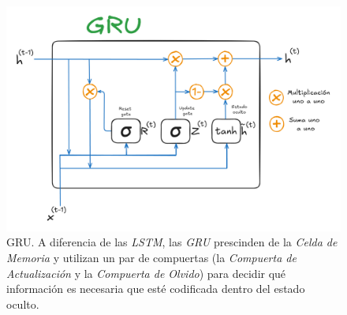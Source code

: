 \begin{figure}[ht!]
\centering
\includegraphics[width=1.0 \textwidth]{Chapters/2. Transformer/Figures/rnn/GRU.png}
\caption{GRU. A diferencia de las \textit{LSTM}, las \textit{GRU} prescinden de la
         \textit{Celda de Memoria} y utilizan un par de compuertas (la \textit{Compuerta de
         Actualización} y la \textit{Compuerta de Olvido}) para decidir qué información es necesaria
         que esté codificada dentro del estado oculto.}
\label{fig:rnn_gru}
\end{figure}

